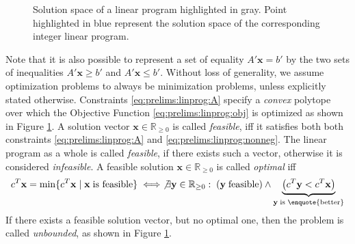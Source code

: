 \begin{figure}[ht!]
\begin{minipage}{0.45\textwidth}
			\end{minipage}
			\caption{Solution space of a linear program highlighted in gray. Point highlighted in blue represent the solution space of the corresponding integer linear program.}
			\label{fig:prelims:linear:solspace:unbounded}
		\end{figure}
		
		Note that it is also possible to represent a set of equality $A' \mathbf{x} = b'$ by the two sets of inequalities $A' \mathbf{x} \geq b'$ and $A' \mathbf{x} \leq b'$.
		Without loss of generality, we assume optimization problems to always be minimization problems, unless explicitly stated otherwise.
		Constraints \ref{eq:prelims:linprog:A} specify a \textit{convex} polytope over which the Objective Function \ref{eq:prelims:linprog:obj} is optimized as shown in Figure \ref{fig:prelims:linear:solspace:unbounded}. A solution vector $\mathbf{x} \in \mathbb{R}_{\geq 0}$ is called \textit{feasible}, iff it satisfies both both constraints \ref{eq:prelims:linprog:A} and \ref{eq:prelims:linprog:nonneg}.
		The linear program as a whole is called \textit{feasible}, if there exists such a vector, otherwise it is considered \textit{infeasible}.
		A feasible solution $\mathbf{x} \in \mathbb{R}_{\geq 0}$ is called \textit{optimal} iff
		\begin{equation*}
			c^T \mathbf{x} = \min \{ c^T \mathbf{x} \mid \mathbf{x} \; \text{is feasible} \} \iff \not\exists \mathbf{y} \in \mathbb{R}_{\geq 0}: \; \left(\mathbf{y} \; \text{feasible}\right) \land \underbrace{\left(c^T \mathbf{y} < c^T \mathbf{x}\right)}_{\mathbf{y} \; \text{is \enquote{better}}}
		\end{equation*}
		If there exists a feasible solution vector, but no optimal one, then the problem is called \textit{unbounded}, as shown in Figure \ref{fig:prelims:linear:solspace:unbounded}.
		
